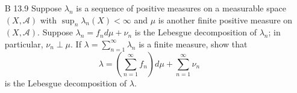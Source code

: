 \documentclass[10pt]{article}
\newcommand{\R}{\mathbb{R}}
\newcommand{\A}{\mathcal{A}}
\begin{document}
\begin{enumerate}
\begin{proof}
Now take a sequence $s_n$ of simple functions increasing to $g$.  For all $A \in \A$ and for each $n$, we have
$$
\int_A s_n d\nu = \int_A s_n f d\mu.
$$
Thus, by the monotone convergence theorem,
$$
\rho(A) = \int_A d\rho = \int_A g d\nu = \int_A (g \cdot f) d\mu.
$$
So $\frac{d\rho}{d\mu} = g\cdot f = \frac{d\rho}{d\nu} \cdot \frac{d\nu}{d\mu}.$

\begin{comment}
To deal with the general case, first note that if $\mu_1$ and $\mu_2$ are signed, finite measures on $\A$, then so is $c_1\mu_1 + c_2\mu_2$ for any $c_1,c_2 \in \R$.  Further, if $\mu_1, \mu_2 \ll \nu$ then also $c_1\mu_1 + c_2\mu_2 \ll \nu$, and
$$
(c_1\mu_1 + c_2\mu_2)(A) = \int_A c_1\frac{d\mu_1}{d\nu}d\nu + c_2\int_A \frac{d\mu_2}{d\nu}d\nu = \int_A \left( c_1\frac{d\mu_1}{d\nu} + c_2\frac{d\mu_2}{d\nu} \right) d\nu
$$
and so $\frac{d(c_1\mu_1+c_2\mu_2)}{d\nu} = c_1\frac{d\mu_1}{d\nu} + c_2\frac{d\mu_2}{d\nu}$.

Now in the case of signed measures $\rho \ll \nu \ll \mu$, we have
$$
\frac{d\rho}{d\mu} = \frac{d(\rho^+ - \rho^-)}{d\mu}
$$
\end{comment}
\end{proof}

\begin{comment}

\item[B 13.9]  Let $\mu$ be a positive measure and $\nu$ a signed measure.  Prove that $\nu \ll \mu$ if and only if $\nu^+ \ll \mu$ and $\nu^- \ll \mu$.

\begin{proof}
Let $X = E \cup F$ with $E$ and $F$ disjoint and $\nu^+(E) = \nu^-(F) = 0$.  One direction is trivial: suppose $\nu^+ \ll \mu$ and $\nu^- \ll \mu$, and suppose $\mu(A) = 0$ for some $A \subseteq X$; then $\nu(A) = \nu^+(A) - \nu^-(A) = 0-0 = 0$, so $\nu \ll \mu$.

Now suppose $\nu \ll \mu$, and $\mu(A) = 0$ for some $A \subseteq X$.  Since $\mu$ is a positive measure, $\mu(A \cap E) = \mu(A \cap F) = 0$ by monotonicity, thus $\nu(A \cap E) = \nu(A \cap F) = 0$.  But
$$
\nu^+(A\cap F) = \nu(A \cap F) + \nu^-(A \cap F) = 0 + 0 =  0
$$
and similarly $\nu^-(A\cap E) = 0$.  Thus, $\nu^+(A) = \nu^+(A \cap F) = 0$ and $\nu^-(A) = \nu^-(A \cap E) = 0$, thus $\nu^+ \ll \mu$ and $\nu^- \ll \mu$.
\end{proof}

\end{comment}

\item[B 13.9] Suppose $\lambda_n$ is a sequence of positive measures on a measurable space $(X,\A)$ with $\sup_n \lambda_n(X) < \infty$ and $\mu$ is another finite positive measure on $(X,\A)$.  Suppose $\lambda_n = f_n d\mu + \nu_n$ is the Lebesgue decomposition of $\lambda_n$; in particular, $\nu_n \perp \mu$.  If $\lambda = \sum_{n=1}^\infty \lambda_n$ is a finite measure, show that
$$
\lambda = \left(\sum_{n=1}^\infty f_n \right) d\mu + \sum_{n=1}^\infty \nu_n
$$
is the Lebesgue decomposition of $\lambda$.


\end{enumerate}
\end{document}

